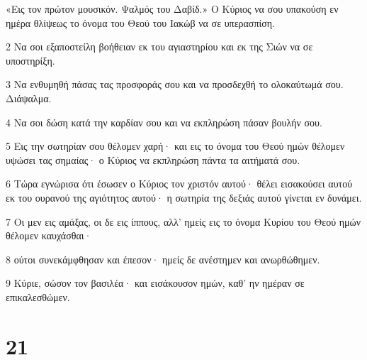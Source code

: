 \par «Εις τον πρώτον μουσικόν. Ψαλμός του Δαβίδ.» Ο Κύριος να σου υπακούση εν ημέρα θλίψεως το όνομα του Θεού του Ιακώβ να σε υπερασπίση.
\par 2 Να σοι εξαποστείλη βοήθειαν εκ του αγιαστηρίου και εκ της Σιών να σε υποστηρίξη.
\par 3 Να ενθυμηθή πάσας τας προσφοράς σου και να προσδεχθή το ολοκαύτωμά σου. Διάψαλμα.
\par 4 Να σοι δώση κατά την καρδίαν σου και να εκπληρώση πάσαν βουλήν σου.
\par 5 Εις την σωτηρίαν σου θέλομεν χαρή· και εις το όνομα του Θεού ημών θέλομεν υψώσει τας σημαίας· ο Κύριος να εκπληρώση πάντα τα αιτήματά σου.
\par 6 Τώρα εγνώρισα ότι έσωσεν ο Κύριος τον χριστόν αυτού· θέλει εισακούσει αυτού εκ του ουρανού της αγιότητος αυτού· η σωτηρία της δεξιάς αυτού γίνεται εν δυνάμει.
\par 7 Οι μεν εις αμάξας, οι δε εις ίππους, αλλ' ημείς εις το όνομα Κυρίου του Θεού ημών θέλομεν καυχάσθαι·
\par 8 ούτοι συνεκάμφθησαν και έπεσον· ημείς δε ανέστημεν και ανωρθώθημεν.
\par 9 Κύριε, σώσον τον βασιλέα· και εισάκουσον ημών, καθ' ην ημέραν σε επικαλεσθώμεν.

\chapter{21}

